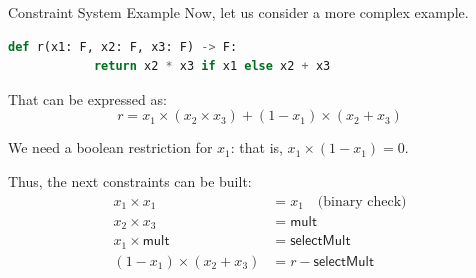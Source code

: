 \documentclass{zkdl-presentation-template}
\begin{document}
    \begin{frame}[fragile]{Constraint System Example}
        Now, let us consider a more complex example.
        \begin{lstlisting}[language=Python,numbers=none]
        def r(x1: F, x2: F, x3: F) -> F:
            return x2 * x3 if x1 else x2 + x3
        \end{lstlisting}

        \vspace{-10pt}

        That can be expressed as:
        \begin{equation*}
            r = x_1 \times (x_2 \times x_3) + (1 - x_1) \times (x_2 + x_3)
        \end{equation*}
        
        
        \begin{block}{}
            We need a boolean restriction for $x_1$: that is, $x_1 \times (1 - x_1) = 0$.
        \end{block}

        
        Thus, the next constraints can be built:
        \vspace{-5pt}
        \begin{align*}
            x_1 \times x_1 &= x_1 \quad \text{(binary check)} \tag{1} \\
            x_2 \times x_3 &= \mathsf{mult} \tag{2} \\
            x_1 \times \mathsf{mult} &= \mathsf{selectMult} \tag{3} \\
            (1 - x_1) \times (x_2 + x_3) &= r - \mathsf{selectMult} \tag{4}
        \end{align*}
    \end{frame}
\end{document}
